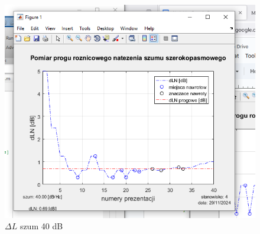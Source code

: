 \documentclass[12pt]{article}
\begin{document}
\begin{figure}[H]
    \centering
    \includegraphics[width=\textwidth]{szum_40.png}
    \caption{$\Delta L$ szum 40 dB}
\end{figure}
\end{document}
